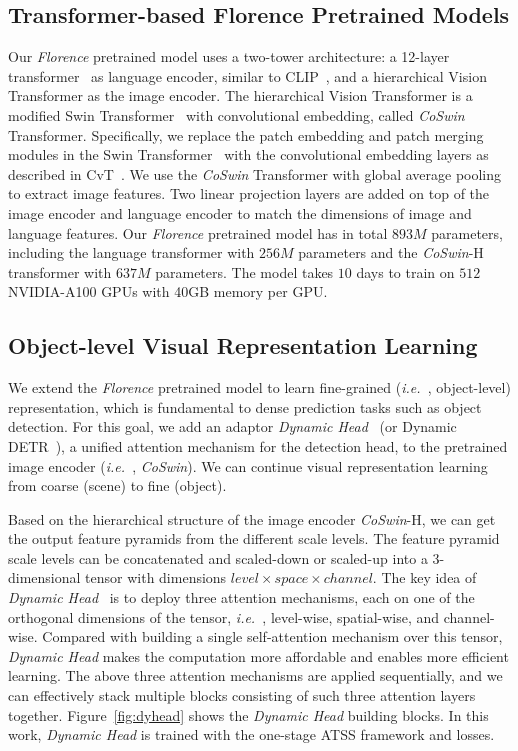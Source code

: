 \documentclass{article}
\newcommand{\ie}{{\it{i.e.}~}}
\begin{document}
\subsection{Transformer-based Florence Pretrained Models}
\label{sect:architecture}

Our \emph{Florence} pretrained model uses a two-tower architecture: a 12-layer transformer~\cite{NIPS2017_3f5ee243} %
as language encoder, similar to CLIP~\cite{radford2021learning}, and a
hierarchical Vision Transformer as the image encoder. The hierarchical Vision Transformer is
a modified Swin Transformer~\cite{liu2021Swin} with convolutional embedding, called \emph{CoSwin} Transformer. Specifically, we replace the patch embedding and patch merging
modules in the Swin Transformer~\cite{liu2021Swin} with the convolutional embedding layers as
described in CvT~\cite{Wu_2021_ICCV}. We use the \emph{CoSwin} Transformer with global average
pooling to extract image features. Two linear projection layers are added on top of the image
encoder and language encoder to match the dimensions of image and language features. Our \emph{Florence} pretrained model has
in total $893M$ parameters, including the language transformer with $256M$ parameters and the
\emph{CoSwin}-H transformer with $637M$ parameters. The model takes $10$ days to train on $512$
NVIDIA-A100 GPUs with 40GB memory per GPU.

\subsection{Object-level Visual Representation Learning}

We extend the \emph{Florence} pretrained model to learn fine-grained (\ie, object-level) representation, which is fundamental to
dense prediction tasks such as object detection. For this goal, we add an adaptor \emph{Dynamic Head}~\cite{Dai_2021_CVPR} (or Dynamic DETR~\cite{Dai_2021_ICCV}), a unified attention
mechanism for the detection head, to the pretrained image encoder (\ie, \emph{CoSwin}). We can continue visual representation learning from coarse (scene) to fine (object).

Based on the hierarchical structure of the image encoder \emph{CoSwin}-H, we can get the output
feature pyramids from the different scale levels. The feature pyramid scale levels can be concatenated and
scaled-down or scaled-up into a 3-dimensional tensor with dimensions $level \times space \times
channel$. The key idea of \emph{Dynamic Head}~\cite{Dai_2021_CVPR} is to deploy three attention
mechanisms, each on one of the orthogonal dimensions of the tensor, \ie, level-wise, spatial-wise, and
channel-wise. Compared with building a single self-attention mechanism over this tensor, \emph{Dynamic
Head} makes the computation more affordable and enables more efficient learning. The above three
attention mechanisms are applied sequentially, and we can effectively stack multiple blocks
consisting of such three attention layers together. Figure~\ref{fig:dyhead} shows the \emph{Dynamic
Head} building blocks. In this work, \emph{Dynamic Head} is trained with the one-stage ATSS
framework and losses.
\end{document}
